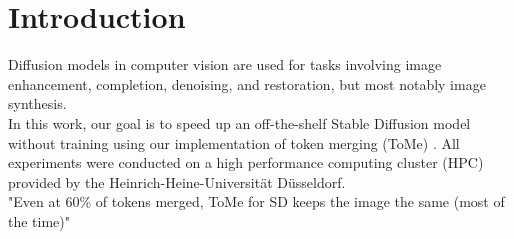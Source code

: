 \section{Introduction}
Diffusion models in computer vision are used for tasks involving image enhancement, completion, denoising, and restoration, but most notably image synthesis.\\
In this work, our goal is to speed up an off-the-shelf Stable Diffusion model without training using our implementation of token merging (ToMe) \cite{bolya2023tomesd}.
All experiments were conducted on a high performance computing cluster (HPC) provided by the Heinrich-Heine-Universität Düsseldorf.\\
"Even at 60\% of tokens merged, ToMe for SD keeps the image the same (most of the time)"